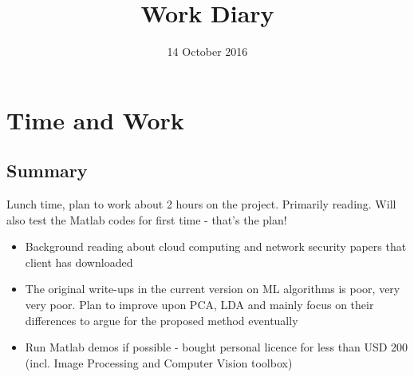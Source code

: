 \documentclass[a4paper]{article}
\title{Work Diary}
\author{}
\date{14 October 2016}
\begin{document}
\maketitle
	

\section{Time and Work}

\subsection{Summary}
Lunch time, plan to work about 2 hours on the project. Primarily reading. Will also test the Matlab codes for first time - that's the plan!
\begin{itemize}
	\item Background reading about cloud computing and network security papers that client has downloaded
	\item The original write-ups in the current version on ML algorithms is poor, very very poor. Plan to improve upon PCA, LDA and mainly focus on their differences to argue for the proposed method eventually
	\item Run Matlab demos if possible - bought personal licence for less than USD 200 (incl. Image Processing and Computer Vision toolbox) 
\end{itemize}
\end{document}
